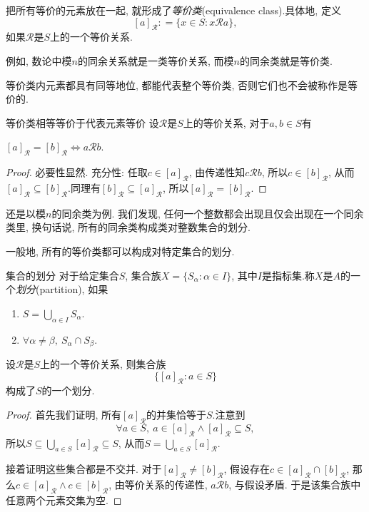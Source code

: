 把所有等价的元素放在一起, 就形成了\textit{等价类}(equivalence class).具体地, 定义$$[a]_{\mathcal{R}} : = \{ x \in S: x\mathcal{R}a \}, $$如果$\mathcal{R}$是$S$上的一个等价关系.

例如, 数论中模$n$的同余关系就是一类等价关系, 而模$n$的同余类就是等价类.

等价类内元素都具有同等地位, 都能代表整个等价类, 否则它们也不会被称作是等价的.

\begin{proposition}{等价类相等等价于代表元素等价}
	设$\mathcal{R}$是$S$上的等价关系, 对于$a, b \in S$有
	\begin{center}
		$[a]_{\mathcal{R}} = [b]_{\mathcal{R}} \Leftrightarrow a\mathcal{R} b.$
	\end{center}
\end{proposition}
\begin{proof}
	必要性显然. 充分性: 任取$c \in [a]_{\mathcal{R}}$, 由传递性知$c \mathcal{R} b$, 所以$c \in [b]_{\mathcal{R}}$, 从而$[a]_{\mathcal{R}} \subseteq [b]_{\mathcal{R}}$.同理有$[b]_{\mathcal{R}} \subseteq [a]_{\mathcal{R}}$, 所以$[a]_{\mathcal{R}} = [b]_{\mathcal{R}}$.
\end{proof}

还是以模$n$的同余类为例. 我们发现, 任何一个整数都会出现且仅会出现在一个同余类里, 换句话说, 所有的同余类构成类对整数集合的划分. 

一般地, 所有的等价类都可以构成对特定集合的划分. 

\begin{definition}{集合的划分}
	对于给定集合$S$, 集合族$X=\{ S_{\alpha} :  \alpha \in I \}$, 其中$I$是指标集.称$X$是$A$的一个\textit{划分}(partition), 如果
	\begin{enumerate}
		\item $S = \bigcup_{\alpha \in I} S_{\alpha}$.
		\item $\forall \alpha \neq \beta , ~S_{\alpha} \cap S_{\beta}$.
	\end{enumerate}
\end{definition}

\begin{theorem}{}
	设$\mathcal{R}$是$S$上的一个等价关系, 则集合族$$\{ [a]_{\mathcal{R}}: a \in S \}$$构成了$S$的一个划分.
\end{theorem}
\begin{proof}
	首先我们证明, 所有$[a]_{\mathcal{R}}$的并集恰等于$S$.注意到$$\forall a \in S, ~a \in [a]_{\mathcal{R}} \wedge [a]_{\mathcal{R}} \subseteq S, $$
	所以$S \subseteq \bigcup_{a \in S} [a]_{\mathcal{R}} \subseteq S$, 从而$S = \bigcup_{a \in S} [a]_{\mathcal{R}}$. 
	
	接着证明这些集合都是不交并. 对于$[a]_{\mathcal{R}} \neq [b]_{\mathcal{R}}$, 假设存在$c \in [a]_{\mathcal{R}} \cap [b]_{\mathcal{R}}$, 那么$c \in [a]_{\mathcal{R}} \wedge c \in [b]_{\mathcal{R}}$, 由等价关系的传递性, $a\mathcal{R}b$, 与假设矛盾. 于是该集合族中任意两个元素交集为空.
\end{proof}


